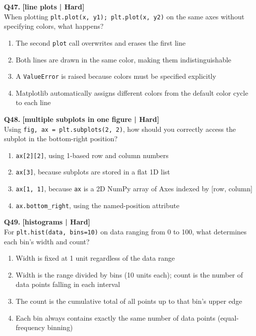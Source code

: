 \noindent\textbf{Q47.} \hfill {\small\color{LPUOrange}\textbf{[line plots | Hard]}}\\[2pt]
When plotting \texttt{plt.plot(x, y1); plt.plot(x, y2)} on the same axes without specifying colors, what happens?

\begin{enumerate}[label=(\alph*),topsep=2pt,itemsep=1pt,partopsep=0pt,parsep=0pt]
    \item \relax The second \texttt{plot} call overwrites and erases the first line
    \item \relax Both lines are drawn in the same color, making them indistinguishable
    \item \relax A \texttt{ValueError} is raised because colors must be specified explicitly
    \item \relax Matplotlib automatically assigns different colors from the default color cycle to each line
\end{enumerate}
\vspace{2mm}

\noindent\textbf{Q48.} \hfill {\small\color{LPUOrange}\textbf{[multiple subplots in one figure | Hard]}}\\[2pt]
Using \texttt{fig, ax = plt.subplots(2, 2)}, how should you correctly access the subplot in the bottom-right position?

\begin{enumerate}[label=(\alph*),topsep=2pt,itemsep=1pt,partopsep=0pt,parsep=0pt]
    \item \relax \texttt{ax[2][2]}, using 1-based row and column numbers
    \item \relax \texttt{ax[3]}, because subplots are stored in a flat 1D list
    \item \relax \texttt{ax[1, 1]}, because \texttt{ax} is a 2D NumPy array of Axes indexed by [row, column]
    \item \relax \texttt{ax.bottom\_right}, using the named-position attribute
\end{enumerate}
\vspace{2mm}

\noindent\textbf{Q49.} \hfill {\small\color{LPUOrange}\textbf{[histograms | Hard]}}\\[2pt]
For \texttt{plt.hist(data, bins=10)} on data ranging from 0 to 100, what determines each bin's width and count?

\begin{enumerate}[label=(\alph*),topsep=2pt,itemsep=1pt,partopsep=0pt,parsep=0pt]
    \item \relax Width is fixed at 1 unit regardless of the data range
    \item \relax Width is the range divided by bins (10 units each); count is the number of data points falling in each interval
    \item \relax The count is the cumulative total of all points up to that bin's upper edge
    \item \relax Each bin always contains exactly the same number of data points (equal-frequency binning)
\end{enumerate}
\vspace{2mm}

